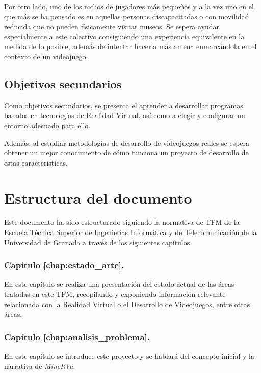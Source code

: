 Por otro lado, uno de los nichos de jugadores más pequeños y a la vez uno en el que más se ha pensado es en aquellas personas discapacitadas o con movilidad reducida que no pueden físicamente visitar museos. Se espera ayudar especialmente a este colectivo consiguiendo una experiencia equivalente en la medida de lo posible, además de intentar hacerla más amena enmarcándola en el contexto de un videojuego.

\subsection{Objetivos secundarios}

Como objetivos secundarios, se presenta el aprender a desarrollar programas basados en tecnologías de Realidad Virtual, así como a elegir y configurar un entorno adecuado para ello.

Además, al estudiar metodologías de desarrollo de videojuegos reales se espera obtener un mejor conocimiento de cómo funciona un proyecto de desarrollo de estas características.

\section{Estructura del documento}

Este documento ha sido estructurado siguiendo la normativa de \acs{TFM} de la Escuela Técnica Superior de Ingenierías Informática y de Telecomunicación de la Universidad de Granada a través de los siguientes capítulos.

\subsubsection{Capítulo \ref{chap:estado_arte}. }

En este capítulo se realiza una presentación del estado actual de las áreas tratadas en este \acs{TFM}, recopilando y exponiendo información relevante relacionada con la Realidad Virtual o el Desarrollo de Videojuegos, entre otras áreas.

\subsubsection{Capítulo \ref{chap:analisis_problema}. }

En este capítulo se introduce este proyecto y se hablará del concepto inicial y la narrativa de \textit{MineRVa}.

